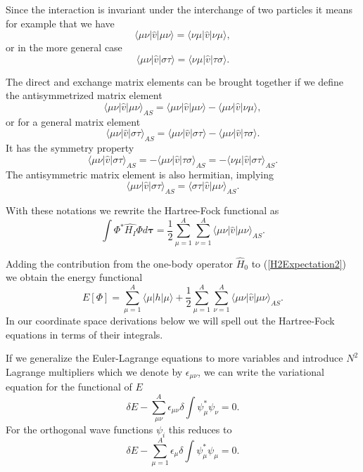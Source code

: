 \documentclass[graybox,sectrefs,envcountresetchap,open=right]{svmonodo}
\begin{document}
Since the interaction is invariant under the interchange of two particles it means for example that we have
\[
\langle \mu\nu|\hat{v}|\mu\nu\rangle =  \langle \nu\mu|\hat{v}|\nu\mu\rangle,  
\]
or in the more general case
\[
\langle \mu\nu|\hat{v}|\sigma\tau\rangle =  \langle \nu\mu|\hat{v}|\tau\sigma\rangle.  
\]



The direct and exchange matrix elements can be  brought together if we define the antisymmetrized matrix element
\[
\langle \mu\nu|\hat{v}|\mu\nu\rangle_{AS}= \langle \mu\nu|\hat{v}|\mu\nu\rangle-\langle \mu\nu|\hat{v}|\nu\mu\rangle,
\]
or for a general matrix element  
\[
\langle \mu\nu|\hat{v}|\sigma\tau\rangle_{AS}= \langle \mu\nu|\hat{v}|\sigma\tau\rangle-\langle \mu\nu|\hat{v}|\tau\sigma\rangle.
\]
It has the symmetry property
\[
\langle \mu\nu|\hat{v}|\sigma\tau\rangle_{AS}= -\langle \mu\nu|\hat{v}|\tau\sigma\rangle_{AS}=-\langle \nu\mu|\hat{v}|\sigma\tau\rangle_{AS}.
\]
The antisymmetric matrix element is also hermitian, implying 
\[
\langle \mu\nu|\hat{v}|\sigma\tau\rangle_{AS}= \langle \sigma\tau|\hat{v}|\mu\nu\rangle_{AS}.
\]



With these notations we rewrite the Hartree-Fock functional as
\begin{equation}
  \int \Phi^*\hat{H_I}\Phi d\mathbf{\tau} 
  = \frac{1}{2}\sum_{\mu=1}^A\sum_{\nu=1}^A \langle \mu\nu|\hat{v}|\mu\nu\rangle_{AS}. \label{H2Expectation2}
\end{equation}

Adding the contribution from the one-body operator $\hat{H}_0$ to
(\ref{H2Expectation2}) we obtain the energy functional 
\begin{equation}
  E[\Phi] 
  = \sum_{\mu=1}^A \langle \mu | h | \mu \rangle +
  \frac{1}{2}\sum_{{\mu}=1}^A\sum_{{\nu}=1}^A \langle \mu\nu|\hat{v}|\mu\nu\rangle_{AS}. \label{FunctionalEPhi}
\end{equation}
In our coordinate space derivations below we will spell out the Hartree-Fock equations in terms of their integrals.




If we generalize the Euler-Lagrange equations to more variables 
and introduce $N^2$ Lagrange multipliers which we denote by 
$\epsilon_{\mu\nu}$, we can write the variational equation for the functional of $E$
\[
  \delta E - \sum_{\mu\nu}^A \epsilon_{\mu\nu} \delta
  \int \psi_{\mu}^* \psi_{\nu} = 0.
\]
For the orthogonal wave functions $\psi_{i}$ this reduces to
\[
  \delta E - \sum_{\mu=1}^A \epsilon_{\mu} \delta
  \int \psi_{\mu}^* \psi_{\mu} = 0.
\]
\end{document}
